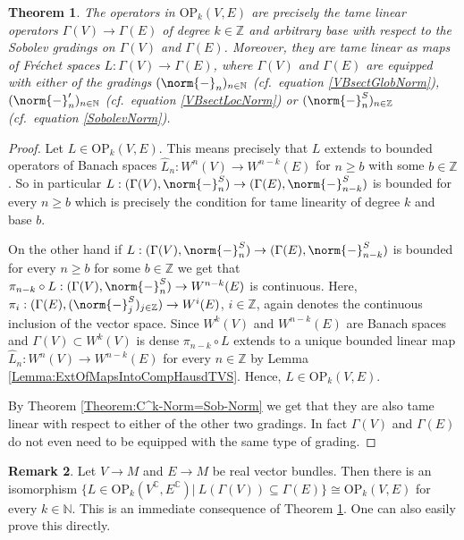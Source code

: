 \documentclass[12pt,a4paper]{article}
\theoremstyle{plain}
\newtheorem{theorem}{Theorem}[subsection]
\theoremstyle{definition}
\newtheorem{remark}[theorem]{Remark}
\newcommand{\N}{\mathbb{N}}
\newcommand{\nnorm}[2]{\norm{#1}_{#2}}
\newcommand{\OP}{\mathrm{OP}}
\begin{document}
\begin{theorem}
\label{Theorem:OP_k=Gr_k}
The operators in $\OP_k(V,E)$ are precisely the tame linear operators $\Gamma(V)\to \Gamma(E)$ of degree $k\in \mathbb Z$ and arbitrary base with respect to the Sobolev gradings on $\Gamma(V)$ and $\Gamma(E)$.
Moreover, they are tame linear as maps of Fréchet spaces $L:\Gamma(V)\to \Gamma(E)$, where $\Gamma(V)$ and $\Gamma(E)$ are equipped with either of the gradings $(\nnorm{-}{n})_{n\in \N}$ (cf.~equation \eqref{VBsectGlobNorm}), $(\nnorm{-}{n}')_{n\in \N}$ (cf.~equation \eqref{VBsectLocNorm}) or $(\nnorm{-}{n}^S)_{n\in \mathbb Z}$ (cf.~equation \eqref{SobolevNorm}).
\end{theorem}
\begin{proof}
Let $L\in \OP_k(V,E)$. This means precisely that $L$ extends to bounded operators of Banach spaces
$\hat L_n:W^n(V)\to W^{n-k}(E)$ for $n\geq b$ with some $b\in \mathbb Z$. So in particular $L:(\Gamma(V),\nnorm{-}{n}^S)\to (\Gamma(E),\nnorm{-}{n-k}^S)$ is bounded for every $n\geq b$ which is precisely the condition for tame linearity of degree $k$ and base $b$.

On the other hand if $L:(\Gamma(V),\nnorm{-}{n}^S)\to (\Gamma(E),\nnorm{-}{n-k}^S)$ is bounded for every $n\geq b$ for some $b\in \mathbb Z$ we get that $\pi_{n-k}\circ L:(\Gamma(V),\nnorm{-}{n}^S)\to W^{n-k}(E)$ is continuous. Here,
$\pi_i:(\Gamma(E),(\nnorm{-}{j}^S)_{j\in \mathbb{Z}})\to W^i(E)$, $i\in \mathbb Z$, again denotes the continuous inclusion of the vector space. 
Since $W^k(V)$ and $W^{n-k}(E)$ are Banach spaces and $\Gamma(V)\subset W^k(V)$ is dense $\pi_{n-k}\circ L$ extends to a unique bounded linear map $\hat L_n:W^n(V)\to W^{n-k}(E)$ for every $n\in \mathbb Z$ by Lemma \ref{Lemma:ExtOfMapsIntoCompHausdTVS}.
Hence, $L\in \OP_k(V,E)$.

By Theorem \ref{Theorem:C^k-Norm=Sob-Norm} we get that they are also tame linear with respect to either of the other two gradings. In fact $\Gamma(V)$ and $\Gamma(E)$ do not even need to be equipped with the same type of grading.
\end{proof}

\begin{remark}
\label{Rem:RealOpsComplexifications}
Let $V\to M$ and $E\to M$ be real vector bundles. Then there is an isomorphism $\{L\in \mathrm{OP}_k(V^{\mathbb C},E^{\mathbb C})|~L(\Gamma(V))\subseteq \Gamma(E)\}\cong \mathrm{OP}_k(V,E)$ for every $k\in \N$. This is an immediate consequence of Theorem \ref{Theorem:OP_k=Gr_k}. One can also easily prove this directly. 
\end{remark}
\end{document}
